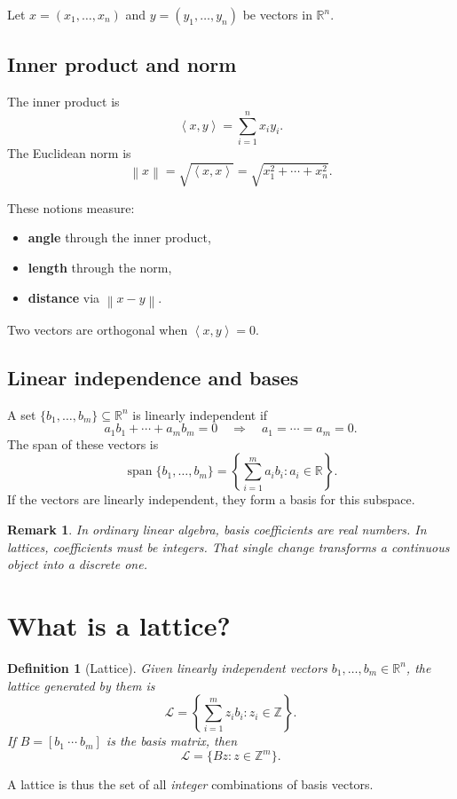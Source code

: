 \documentclass[11pt]{article}
\newtheorem{definition}[theorem]{Definition}
\newtheorem{remark}[theorem]{Remark}
\newcommand{\R}{\mathbb{R}}
\newcommand{\Z}{\mathbb{Z}}
\newcommand{\norm}[1]{\left\lVert #1 \right\rVert}
\newcommand{\ip}[2]{\left\langle #1,#2 \right\rangle}
\newcommand{\calL}{\mathcal{L}}
\newcommand{\Span}{\operatorname{span}}
\begin{document}
Let $x=(x_1,\dots,x_n)$ and $y=(y_1,\dots,y_n)$ be vectors in $\R^n$.

\subsection{Inner product and norm}
The inner product is
\[
\ip{x}{y}=\sum_{i=1}^n x_i y_i.
\]
The Euclidean norm is
\[
\norm{x}=\sqrt{\ip{x}{x}} = \sqrt{x_1^2+\cdots+x_n^2}.
\]

These notions measure:
\begin{itemize}
    \item \textbf{angle} through the inner product,
    \item \textbf{length} through the norm,
    \item \textbf{distance} via $\norm{x-y}$.
\end{itemize}

Two vectors are orthogonal when $\ip{x}{y}=0$.

\subsection{Linear independence and bases}
A set $\{b_1,\dots,b_m\}\subseteq \R^n$ is linearly independent if
\[
a_1b_1+\cdots+a_m b_m=0
\quad\Longrightarrow\quad
 a_1=\cdots=a_m=0.
\]
The span of these vectors is
\[
\Span\{b_1,\dots,b_m\}=\left\{\sum_{i=1}^m a_i b_i : a_i\in \R\right\}.
\]
If the vectors are linearly independent, they form a basis for this subspace.

\begin{remark}
In ordinary linear algebra, basis coefficients are real numbers. In lattices, coefficients must be integers. That single change transforms a continuous object into a discrete one.
\end{remark}

\section{What is a lattice?}

\begin{definition}[Lattice]
Given linearly independent vectors $b_1,\dots,b_m\in \R^n$, the lattice generated by them is
\[
\calL = \left\{\sum_{i=1}^m z_i b_i : z_i\in \Z\right\}.
\]
If $B=[b_1\ \cdots\ b_m]$ is the basis matrix, then
\[
\calL = \{Bz : z\in \Z^m\}.
\]
\end{definition}

A lattice is thus the set of all \emph{integer} combinations of basis vectors.
\end{document}

